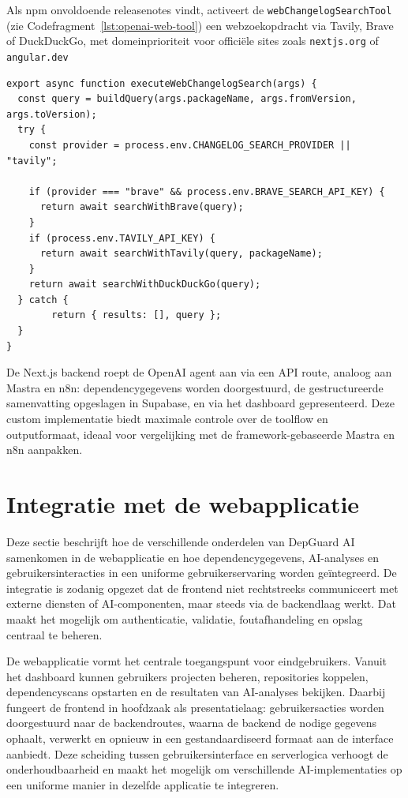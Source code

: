 Als npm onvoldoende releasenotes vindt, activeert de \texttt{webChangelogSearchTool} (zie Codefragment~\ref{lst:openai-web-tool}) een webzoekopdracht via Tavily, Brave of DuckDuckGo, met domeinprioriteit voor officiële sites zoals \texttt{nextjs.org} of \texttt{angular.dev}

\begin{listing}[H]
\begin{verbatim}
export async function executeWebChangelogSearch(args) {
  const query = buildQuery(args.packageName, args.fromVersion, args.toVersion);
  try {
    const provider = process.env.CHANGELOG_SEARCH_PROVIDER || "tavily";

    if (provider === "brave" && process.env.BRAVE_SEARCH_API_KEY) {
      return await searchWithBrave(query);
    }
    if (process.env.TAVILY_API_KEY) {
      return await searchWithTavily(query, packageName);
    }
    return await searchWithDuckDuckGo(query);
  } catch {
        return { results: [], query };
  }
}
\end{verbatim}
\caption{\texttt{webChangelogSearchTool}: webzoekopdrachten naar changelogs}
\label{lst:openai-web-tool}
\end{listing}

De Next.js backend roept de OpenAI agent aan via een API route, analoog aan Mastra en n8n: dependencygegevens worden doorgestuurd, de gestructureerde samenvatting opgeslagen in Supabase, en via het dashboard gepresenteerd. Deze custom implementatie biedt maximale controle over de toolflow en outputformaat, ideaal voor vergelijking met de framework-gebaseerde Mastra en n8n aanpakken.

\section{Integratie met de webapplicatie}

Deze sectie beschrijft hoe de verschillende onderdelen van DepGuard AI samenkomen in de webapplicatie en hoe dependencygegevens, AI-analyses en gebruikersinteracties in een uniforme gebruikerservaring worden geïntegreerd. De integratie is zodanig opgezet dat de frontend niet rechtstreeks communiceert met externe diensten of AI-componenten, maar steeds via de backendlaag werkt. Dat maakt het mogelijk om authenticatie, validatie, foutafhandeling en opslag centraal te beheren.

De webapplicatie vormt het centrale toegangspunt voor eindgebruikers. Vanuit het dashboard kunnen gebruikers projecten beheren, repositories koppelen, dependencyscans opstarten en de resultaten van AI-analyses bekijken. Daarbij fungeert de frontend in hoofdzaak als presentatielaag: gebruikersacties worden doorgestuurd naar de backendroutes, waarna de backend de nodige gegevens ophaalt, verwerkt en opnieuw in een gestandaardiseerd formaat aan de interface aanbiedt. Deze scheiding tussen gebruikersinterface en serverlogica verhoogt de onderhoudbaarheid en maakt het mogelijk om verschillende AI-implementaties op een uniforme manier in dezelfde applicatie te integreren.

